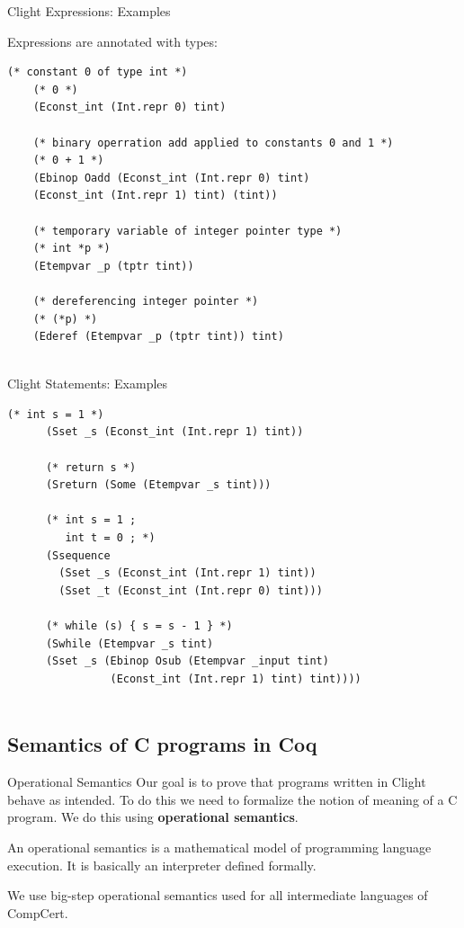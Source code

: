 \documentclass[10pt,usenames,dvipsnames,landscape]{beamer}
\begin{document}
\begin{frame}[fragile]{Clight Expressions: Examples}
  
  Expressions are annotated with types: 
  
  \begin{lstlisting}[language=Coq]
    (* constant 0 of type int *)
    (* 0 *)
    (Econst_int (Int.repr 0) tint) 
     
    (* binary operration add applied to constants 0 and 1 *)
    (* 0 + 1 *)
    (Ebinop Oadd (Econst_int (Int.repr 0) tint)
    (Econst_int (Int.repr 1) tint) (tint))
    
    (* temporary variable of integer pointer type *)
    (* int *p *)
    (Etempvar _p (tptr tint)) 
    
    (* dereferencing integer pointer *)
    (* (*p) *)
    (Ederef (Etempvar _p (tptr tint)) tint)


  \end{lstlisting}
  
\end{frame}

\begin{frame}[fragile]{Clight Statements: Examples}

  \begin{lstlisting}[language=Coq]
      (* int s = 1 *)
      (Sset _s (Econst_int (Int.repr 1) tint))

      (* return s *)
      (Sreturn (Some (Etempvar _s tint)))
      
      (* int s = 1 ;
         int t = 0 ; *)
      (Ssequence 
        (Sset _s (Econst_int (Int.repr 1) tint))
        (Sset _t (Econst_int (Int.repr 0) tint)))
       
      (* while (s) { s = s - 1 } *)
      (Swhile (Etempvar _s tint) 
      (Sset _s (Ebinop Osub (Etempvar _input tint)
                (Econst_int (Int.repr 1) tint) tint))))


  \end{lstlisting}
  


\end{frame}

\subsection{Semantics of C programs in Coq}

\begin{frame}{Operational Semantics}
    Our goal is to prove that programs written in Clight behave as intended. To do this we need to formalize the notion of meaning of a C program. We do this using {\bf operational semantics}.

    \bigskip
    
    An operational semantics is a mathematical model of programming language execution. It is basically an interpreter defined formally.
    \bigskip
    
    We use big-step operational semantics used for all intermediate languages of CompCert.
  \end{frame}
  
\end{document}

